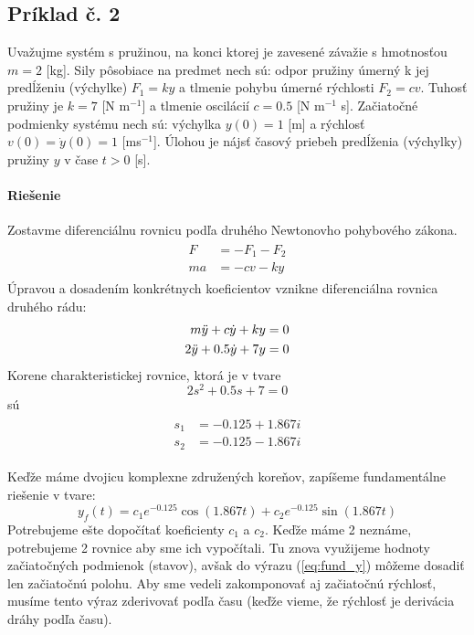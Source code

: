 \documentclass[a4paper, 10pt, ]{article}
\begin{document}
\subsection{Príklad č. 2}

Uvažujme systém s pružinou, na konci ktorej je zavesené závažie s hmotnosťou $m=2$ [kg]. Sily pôsobiace na predmet nech sú: odpor pružiny úmerný k jej predĺženiu (výchylke) $F_1= k y$ a tlmenie pohybu úmerné rýchlosti $F_2 = c v$. Tuhosť pružiny je $k=7$ [N m$^{-1}$] a tlmenie oscilácií $c=0.5$ [N  m$^{-1}$ s]. Začiatočné podmienky systému nech sú: výchylka $y(0) = 1$ [m] a rýchlosť $v(0)=\dot{y}(0) = 1$ [ms$^{-1}$]. Úlohou je nájsť časový priebeh predĺženia (výchylky) pružiny $y$ v čase $t>0$ [s].

\paragraph{Riešenie}

Zostavme diferenciálnu rovnicu podľa druhého Newtonovho pohybového zákona.
\begin{align}
\begin{split}
    F &= - F_1 - F_2 \\
    ma &= -cv - ky 
\end{split}
\end{align}
Úpravou a dosadením konkrétnych koeficientov vznikne diferenciálna rovnica druhého rádu:
\begin{align}
\begin{split}
    m \Ddot{y} + c\Dot{y} + ky &= 0 \\
    2 \Ddot{y} + 0.5\Dot{y} + 7y &= 0
\end{split}
\end{align}
Korene charakteristickej rovnice, ktorá je v tvare
\begin{equation}
    2s^2 + 0.5s + 7 = 0
\end{equation}
sú
\begin{align}
    \begin{split}
        s_{1} &= -0.125 + 1.867i \\
        s_{2} &= -0.125 - 1.867i
    \end{split}
\end{align}


Keďže máme dvojicu komplexne združených koreňov, zapíšeme fundamentálne riešenie v tvare:
\begin{equation}\label{eq:fund_y}
    y_f(t) = c_{1}e^{-0.125}\cos{(1.867t)} + c_{2}e^{-0.125}\sin{(1.867t)}
\end{equation}
Potrebujeme ešte dopočítať koeficienty $c_1$ a $c_2$. Keďže máme 2 neznáme, potrebujeme 2 rovnice aby sme ich vypočítali. Tu znova využijeme hodnoty začiatočných podmienok (stavov), avšak do výrazu (\ref{eq:fund_y}) môžeme dosadiť len začiatočnú polohu. Aby sme vedeli zakomponovať aj začiatočnú rýchlosť, musíme tento výraz zderivovať podľa času (keďže vieme, že rýchlosť je derivácia dráhy podľa času).
\end{document}
